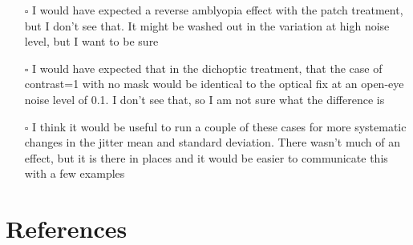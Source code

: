 \documentclass[
  onecolumn]{article}
\providecommand{\tightlist}{%
  \setlength{\itemsep}{0pt}\setlength{\parskip}{0pt}}
\begin{document}
\begin{itemize}
\tightlist
\item[$\square$]
  I would have expected a reverse amblyopia effect with the patch
  treatment, but I don't see that. It might be washed out in the
  variation at high noise level, but I want to be sure
\item[$\square$]
  I would have expected that in the dichoptic treatment, that the case
  of contrast=1 with no mask would be identical to the optical fix at an
  open-eye noise level of 0.1. I don't see that, so I am not sure what
  the difference is
\item[$\square$]
  I think it would be useful to run a couple of these cases for more
  systematic changes in the jitter mean and standard deviation. There
  wasn't much of an effect, but it is there in places and it would be
  easier to communicate this with a few examples
\end{itemize}

\hypertarget{references}{%
\section*{References}\label{references}}
\end{document}
